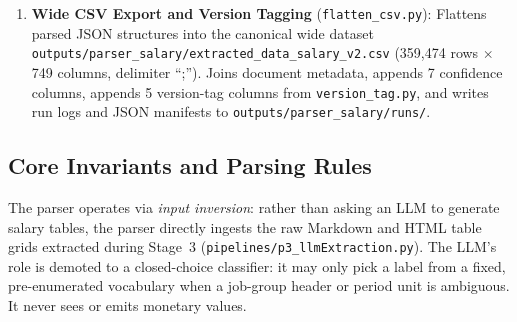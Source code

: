 \begin{enumerate}[leftmargin=1.8em]
  \item \textbf{Wide CSV Export and Version Tagging} (\texttt{flatten\_csv.py}): Flattens parsed JSON structures into the canonical wide dataset \nolinkurl{outputs/parser_salary/extracted_data_salary_v2.csv} (359,474 rows $\times$ 749 columns, delimiter ``;''). Joins document metadata, appends 7 confidence columns, appends 5 version-tag columns from \nolinkurl{version_tag.py}, and writes run logs and JSON manifests to \nolinkurl{outputs/parser_salary/runs/}.
\end{enumerate}

\subsection{Core Invariants and Parsing Rules}
\label{subsec:salary-invariants}

The parser operates via \emph{input inversion}: rather than asking an LLM to generate salary tables, the parser directly ingests the raw Markdown and HTML table grids extracted during Stage~3 (\nolinkurl{pipelines/p3_llmExtraction.py}). The LLM's role is demoted to a closed-choice classifier: it may only pick a label from a fixed, pre-enumerated vocabulary when a job-group header or period unit is ambiguous. It never sees or emits monetary values.

